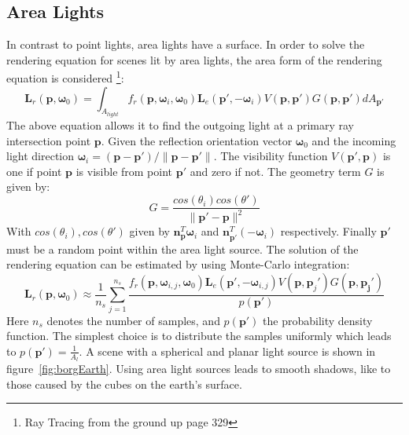 \subsection{Area Lights}
In contrast to point lights, area lights have a surface. In order to solve the rendering equation for scenes lit by area lights, the area form of the rendering equation is considered \footnote{Ray Tracing from the ground up page 329}:
\begin{equation}
\mathbf{L}_r(\mathbf{p},\mathbf{\omega}_0) = \int_{A_{light}} f_r(\mathbf{p},\mathbf{\omega}_i,\mathbf{\omega}_0) \mathbf{L}_e(\mathbf{p}',-\mathbf{\omega}_i)V(\mathbf{p},\mathbf{p}')G(\mathbf{p},\mathbf{p}')dA_{\mathbf{p}'}
\end{equation}
The above equation allows it to find the outgoing light at a primary ray intersection point $\mathbf{p}$. Given the reflection orientation vector $\mathbf{\omega}_0$ and the incoming light direction $\mathbf{\omega}_i = (\mathbf{p} - \mathbf{p}') / \|\mathbf{p} - \mathbf{p}'\|$. The visibility function $V(\mathbf{p}',\mathbf{p})$ is one if point $\mathbf{p}$ is visible from point $\mathbf{p}'$ and zero if not. The geometry term $G$ is given by:
\begin{equation}
G = \frac{cos (\theta_i) cos (\theta')}{\| \mathbf{p}' - \mathbf{p}\| ^ 2}
\end{equation}  
With $cos (\theta_i), cos (\theta')$ given by $\mathbf{n}_\mathbf{p} ^ T \mathbf{\omega}_i$ and $\mathbf{n}^{T}_{\mathbf{p}'} (-\mathbf{\omega}_i)$ respectively. Finally $\mathbf{p}'$ must be a random point within the area light source.
The solution of the rendering equation can be estimated by using Monte-Carlo integration:
\begin{equation}
\mathbf{L}_r(\mathbf{p},\mathbf{\omega}_0) \approx \frac{1}{n_s} \sum_{j=1}^{n_s} \frac{f_r(\mathbf{p},\mathbf{\omega}_{i,j},\mathbf{\omega}_0) \mathbf{L}_e(\mathbf{p}',-\mathbf{\omega}_{i,j})V(\mathbf{p},\mathbf{p}_j')G(\mathbf{p},\mathbf{p_j}')}{p(\mathbf{p}')}
\end{equation}
Here $n_s$ denotes the number of samples, and $p(\mathbf{p}')$ the probability density function. The simplest choice is to distribute the samples uniformly which leads to $p(\mathbf{p}') = \frac{1}{A_l}$. A scene with a spherical and planar light source is shown in figure~\ref{fig:borgEarth}. Using area light sources leads to smooth shadows, like to those caused by the cubes on the earth's surface. 


